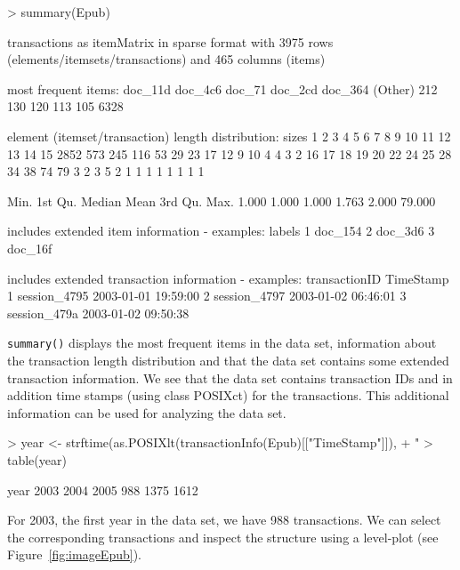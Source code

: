\documentclass[10pt,a4paper]{article}
\newcommand{\class}[1]{\mbox{\textsf{#1}}}
\newcommand{\func}[1]{\mbox{\texttt{#1()}}}
\begin{document}
\begin{Schunk}
\begin{Sinput}
> summary(Epub)
\end{Sinput}
\begin{Soutput}
transactions as itemMatrix in sparse format with
 3975 rows (elements/itemsets/transactions) and
 465 columns (items)

most frequent items:
doc_11d doc_4c6  doc_71 doc_2cd doc_364 (Other) 
    212     130     120     113     105    6328 

element (itemset/transaction) length distribution:
sizes
   1    2    3    4    5    6    7    8    9   10   11   12   13   14   15 
2852  573  245  116   53   29   23   17   12    9   10    4    4    3    2 
  16   17   18   19   20   22   24   25   28   34   38   74   79 
   3    2    3    5    2    1    1    1    1    1    1    1    1 

   Min. 1st Qu.  Median    Mean 3rd Qu.    Max. 
  1.000   1.000   1.000   1.763   2.000  79.000 

includes extended item information - examples:
   labels
1 doc_154
2 doc_3d6
3 doc_16f

includes extended transaction information - examples:
  transactionID           TimeStamp
1  session_4795 2003-01-01 19:59:00
2  session_4797 2003-01-02 06:46:01
3  session_479a 2003-01-02 09:50:38
\end{Soutput}
\end{Schunk}

\func{summary} displays the most frequent items in the data set,
information about the transaction length distribution and that the data
set contains some extended transaction information.  We see that the
data set contains transaction IDs and in addition time stamps (using
class \class{POSIXct}) for the transactions.  This additional
information can be used for analyzing the data set.

\begin{Schunk}
\begin{Sinput}
> year <- strftime(as.POSIXlt(transactionInfo(Epub)[["TimeStamp"]]), 
+     "%
> table(year)
\end{Sinput}
\begin{Soutput}
year
2003 2004 2005 
 988 1375 1612 
\end{Soutput}
\end{Schunk}

For 2003, the first year in the data set, we have 988
transactions.  We can select the corresponding transactions and inspect
the structure using a level-plot (see Figure~\ref{fig:imageEpub}).
\end{document}
